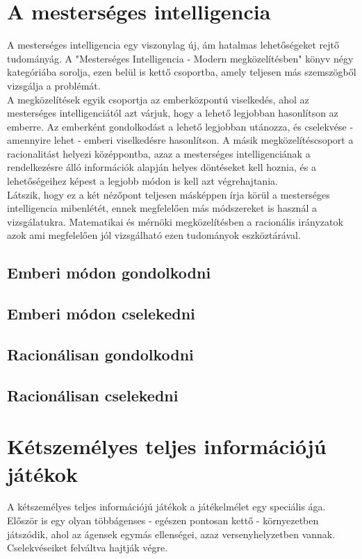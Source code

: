 \label{Chap:tema}

\section {A mesterséges intelligencia}
A mesterséges intelligencia egy viszonylag új, ám hatalmas lehetőségeket rejtő tudományág. A "Mesterséges Intelligencia - Modern megközelítésben" könyv négy kategóriába sorolja, ezen belül is kettő csoportba, amely teljesen más szemszögből vizsgálja a problémát.\\

A megközelítések egyik csoportja az emberközpontú viselkedés, ahol az mesterséges intelligenciától azt várjuk, hogy a lehető legjobban hasonlítson az emberre. Az emberként gondolkodást a lehető legjobban utánozza, és cselekvése - amennyire lehet - emberi viselkedésre hasonlítson. A másik megközelítéscsoport a racionalitást helyezi középpontba, azaz a mesterséges intelligenciának a rendelkezésre álló információk alapján helyes döntéseket kell hoznia, és a lehetőségeihez képest a legjobb módon is kell azt végrehajtania. \\

Látszik, hogy ez a két nézőpont teljesen másképpen írja körül a mesterséges intelligencia mibenlétét, ennek megfelelően más módszereket is használ a vizsgálatukra. Matematikai és mérnöki megközelítésben a racionális irányzatok azok ami megfelelően jól vizsgálható ezen tudományok eszköztárával.
\subsection{Emberi módon gondolkodni}
\subsection{Emberi módon cselekedni}
\subsection{Racionálisan gondolkodni}
\subsection{Racionálisan cselekedni}

\section{Kétszemélyes teljes információjú játékok}
A kétszemélyes teljes információjú játékok a játékelmélet egy speciális ága. Először is egy olyan többágenses - egészen pontosan kettő - környezetben játszódik, ahol az ágensek egymás ellenségei, azaz versenyhelyzetben vannak. Cselekvéseiket felváltva hajtják végre.\\

